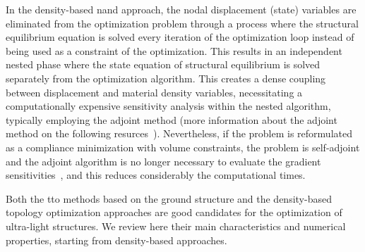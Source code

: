 In the density-based \acrfull{nand} approach, the nodal displacement (state) variables are eliminated from the optimization problem through a process where the structural equilibrium equation is solved every iteration of the optimization loop instead of being used as a constraint of the optimization. This results in an independent nested phase where the state equation of structural equilibrium is solved separately from the optimization algorithm. This creates a dense coupling between displacement and material density variables, necessitating a computationally expensive sensitivity analysis within the nested algorithm, typically employing the adjoint method (more information about the adjoint method on the following resurces~). Nevertheless, if the problem is reformulated as a compliance minimization with volume constraints, the problem is self-adjoint and the adjoint algorithm is no longer necessary to evaluate the gradient sensitivities~, and this reduces considerably the computational times.

Both the \gls{tto} methods based on the ground structure and the density-based topology optimization approaches are good candidates for the optimization of ultra-light structures. We review here their main characteristics and numerical properties, starting from density-based approaches.


